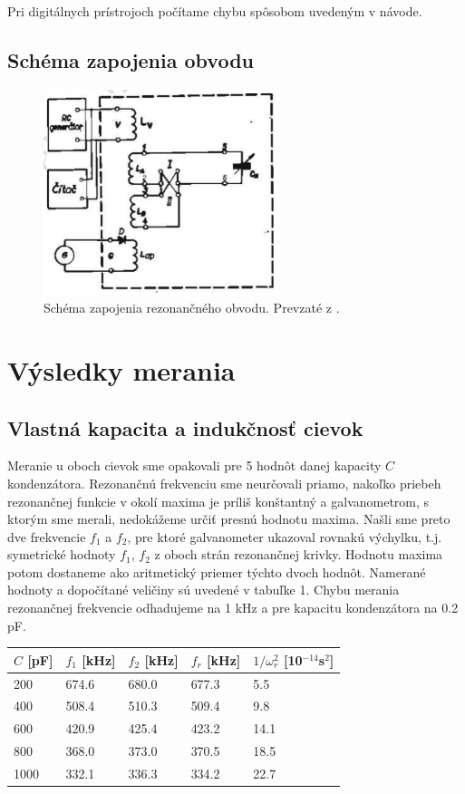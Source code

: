 \documentclass{article}
\begin{document}
Pri digitálnych prístrojoch počítame chybu spôsobom uvedeným v návode.
\newpage


\subsection{Schéma zapojenia obvodu}

\begin{figure}[!htbp]
		\centering
		\includegraphics[height = 6cm]{rezobvod.PNG}
		\caption{Schéma zapojenia rezonančného obvodu. Prevzaté z \cite{2}.}
		\label{fig3:bandf} 
	\end{figure}

\section{Výsledky merania}
\subsection{Vlastná kapacita a indukčnosť cievok}
Meranie u oboch cievok sme opakovali pre 5 hodnôt danej kapacity $C$ kondenzátora. Rezonančnú frekvenciu sme neurčovali priamo, nakoľko priebeh rezonančnej funkcie v okolí maxima je príliš konštantný a galvanometrom, s ktorým sme merali, nedokážeme určiť presnú hodnotu maxima. Našli sme preto dve frekvencie $f_1$ a $f_2$, pre ktoré galvanometer ukazoval rovnakú výchylku, t.j. symetrické hodnoty $f_1$, $f_2$ z oboch strán rezonančnej krivky. Hodnotu maxima potom dostaneme ako aritmetický priemer týchto dvoch hodnôt. Namerané hodnoty a dopočítané veličiny sú uvedené v tabuľke 1. Chybu merania rezonančnej frekvencie odhadujeme na 1 kHz a pre kapacitu kondenzátora na 0.2 pF.

\begin{table}[!htbp]
\centering
{}
\label{tab:cvA}
\begin{tabular}{|l|l|l|l|l|}
\hline
$C$ [pF] & $f_1$ [kHz] & $f_2$ [kHz] &   $f_r$ [kHz]    &   $1/\omega_r^2$ [10$^{-14}$s$^2$]   \\ \hline
200     & 674.6   & 680.0   & 677.3 & 5.5  \\ \hline
400     & 508.4   & 510.3   & 509.4 & 9.8  \\ \hline
600     & 420.9   & 425.4   & 423.2 & 14.1 \\ \hline
800     & 368.0   & 373.0   & 370.5 & 18.5 \\ \hline
1000    & 332.1   & 336.3   & 334.2 & 22.7 \\ \hline
\end{tabular}
\end{table}
\end{document}
